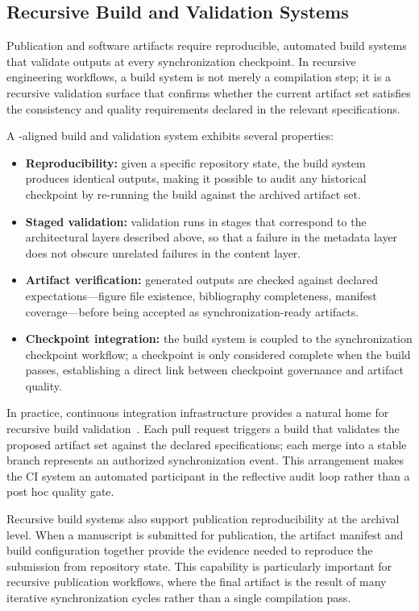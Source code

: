 \subsection{Recursive Build and Validation Systems}

Publication and software artifacts require reproducible, automated build systems that validate outputs at every synchronization checkpoint. In recursive engineering workflows, a build system is not merely a compilation step; it is a recursive validation surface that confirms whether the current artifact set satisfies the consistency and quality requirements declared in the relevant specifications.

A -aligned build and validation system exhibits several properties:
\begin{itemize}
  \item \textbf{Reproducibility:} given a specific repository state, the build system produces identical outputs, making it possible to audit any historical checkpoint by re-running the build against the archived artifact set.
  \item \textbf{Staged validation:} validation runs in stages that correspond to the architectural layers described above, so that a failure in the metadata layer does not obscure unrelated failures in the content layer.
  \item \textbf{Artifact verification:} generated outputs are checked against declared expectations---figure file existence, bibliography completeness, manifest coverage---before being accepted as synchronization-ready artifacts.
  \item \textbf{Checkpoint integration:} the build system is coupled to the synchronization checkpoint workflow; a checkpoint is only considered complete when the build passes, establishing a direct link between checkpoint governance and artifact quality.
\end{itemize}

In practice, continuous integration infrastructure provides a natural home for recursive build validation~\cite{Jimenez2024SWEBench}. Each pull request triggers a build that validates the proposed artifact set against the declared specifications; each merge into a stable branch represents an authorized synchronization event. This arrangement makes the CI system an automated participant in the reflective audit loop rather than a post hoc quality gate.

Recursive build systems also support publication reproducibility at the archival level. When a manuscript is submitted for publication, the artifact manifest and build configuration together provide the evidence needed to reproduce the submission from repository state. This capability is particularly important for recursive publication workflows, where the final artifact is the result of many iterative synchronization cycles rather than a single compilation pass.

